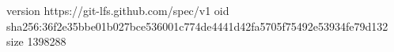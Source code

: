 version https://git-lfs.github.com/spec/v1
oid sha256:36f2e35bbe01b027bce536001c774de4441d42fa5705f75492e53934fe79d132
size 1398288
